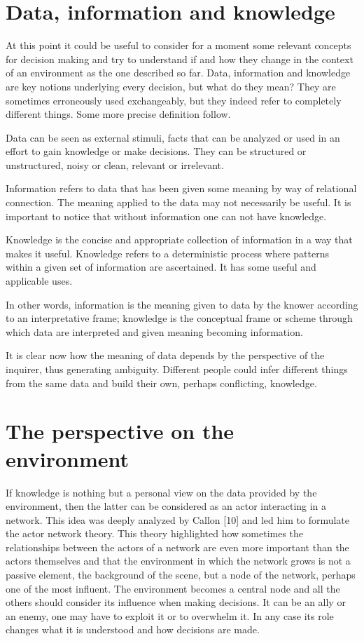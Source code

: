 \section{Data, information and knowledge}

At this point it could be useful to consider for a moment some relevant concepts for decision making and try to understand if and how they change in the context of an environment as the one described so far. Data, information and knowledge are key notions underlying every decision, but what do they mean? They are sometimes erroneously used exchangeably, but they indeed refer to completely different things. Some more precise definition follow.

Data can be seen as external stimuli, facts that can be analyzed or used in an effort to gain knowledge or make decisions. They can be structured or unstructured, noisy or clean, relevant or irrelevant.

Information refers to data that has been given some meaning by way of relational connection. The meaning applied to the data may not necessarily be useful. It is important to notice that without information one can not have knowledge.

Knowledge is the concise and appropriate collection of information in a way that makes it useful. Knowledge refers to a deterministic process where patterns within a given set of information are ascertained. It has some useful and applicable uses.

In other words, information is the meaning given to data by the knower according to an interpretative frame; knowledge is the conceptual frame or scheme through which data are interpreted and given meaning becoming information.

It is clear now how the meaning of data depends by the perspective of the inquirer, thus generating ambiguity. Different people could infer different things from the same data and build their own, perhaps conflicting, knowledge.

\section{The perspective on the environment}
If knowledge is nothing but a personal view on the data provided by the environment, then the latter can be considered as an actor interacting in a network. This idea was deeply analyzed by Callon [10] and led him to formulate the actor network theory. This theory highlighted how sometimes the relationships between the actors of a network are even more important than the actors themselves and that the environment in which the network grows is not a passive element, the background of the scene, but a node of the network, perhaps one of the most influent. The environment becomes a central node and all the others should consider its influence when making decisions. It can be an ally or an enemy, one may have to exploit it or to overwhelm it. In any case its role changes what it is understood and how decisions are made.

